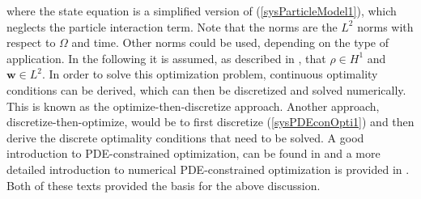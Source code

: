 where the state equation is a simplified version of (\ref{sysParticleModel1}), which neglects the particle interaction term.
Note that the norms are the $L^2$ norms with respect to $\Omega$ and time. Other norms could be used, depending on the type of application. In the following it is assumed, as described in \cite{TroeltzschFredi2010OCoP}, that $\rho \in H^1$ and $\mathbf{w} \in L^2$.
In order to solve this optimization problem, continuous optimality conditions can be derived, which can then be discretized and solved numerically. This is known as the optimize-then-discretize approach.
Another approach, discretize-then-optimize, would be to first discretize (\ref{sysPDEconOpti1}) and then derive the discrete optimality conditions that need to be solved.
A good introduction to PDE-constrained optimization, can be found in \cite{PearsonThesis} and a more detailed introduction to numerical PDE-constrained optimization is provided in \cite{DeLosReyesOptimization}. Both of these texts provided the basis for the above discussion.

